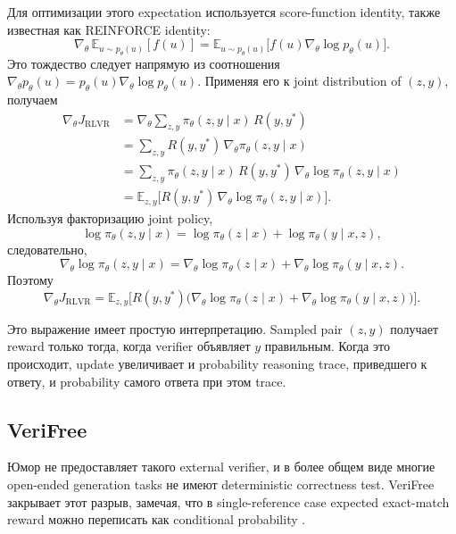 Для оптимизации этого expectation используется score-function identity, также известная как REINFORCE identity:
\[
    \nabla_{\theta}\,\mathbb{E}_{u\sim p_{\theta}(u)}[f(u)]
    =
    \mathbb{E}_{u\sim p_{\theta}(u)}
    \big[f(u)\nabla_{\theta}\log p_{\theta}(u)\big].
\]
Это тождество следует напрямую из соотношения \(\nabla_{\theta}p_{\theta}(u)=p_{\theta}(u)\nabla_{\theta}\log p_{\theta}(u)\). Применяя его к joint distribution of \((z,y)\), получаем
\begin{align*}
    \nabla_{\theta}J_{\mathrm{RLVR}}
     & =
    \nabla_{\theta}
    \sum_{z,y}\pi_{\theta}(z,y\mid x)\,R(y,y^{*})                                             \\
     & =
    \sum_{z,y}R(y,y^{*})\,\nabla_{\theta}\pi_{\theta}(z,y\mid x)                              \\
     & =
    \sum_{z,y}\pi_{\theta}(z,y\mid x)\,R(y,y^{*})\,\nabla_{\theta}\log\pi_{\theta}(z,y\mid x) \\
     & =
    \mathbb{E}_{z,y}\Big[
        R(y,y^{*})\,\nabla_{\theta}\log\pi_{\theta}(z,y\mid x)
        \Big].
\end{align*}
Используя факторизацию joint policy,
\[
    \log\pi_{\theta}(z,y\mid x)
    =
    \log\pi_{\theta}(z\mid x)+\log\pi_{\theta}(y\mid x,z),
\]
следовательно,
\[
    \nabla_{\theta}\log\pi_{\theta}(z,y\mid x)
    =
    \nabla_{\theta}\log\pi_{\theta}(z\mid x)
    +
    \nabla_{\theta}\log\pi_{\theta}(y\mid x,z).
\]
Поэтому
\[
    \nabla_{\theta}J_{\mathrm{RLVR}}
    =
    \mathbb{E}_{z,y}\Big[
        R(y,y^{*})
        \big(
        \nabla_{\theta}\log\pi_{\theta}(z\mid x)
        +
        \nabla_{\theta}\log\pi_{\theta}(y\mid x,z)
        \big)
        \Big].
\]

Это выражение имеет простую интерпретацию. Sampled pair \((z,y)\) получает reward только тогда, когда verifier объявляет \(y\) правильным. Когда это происходит, update увеличивает и probability reasoning trace, приведшего к ответу, и probability самого ответа при этом trace.

\subsection{VeriFree}

Юмор не предоставляет такого external verifier, и в более общем виде многие open-ended generation tasks не имеют deterministic correctness test. VeriFree закрывает этот разрыв, замечая, что в single-reference case expected exact-match reward можно переписать как conditional probability \citep{Zhou2025}.


